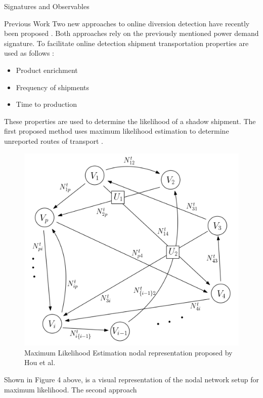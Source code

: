 \documentclass[final]{beamer}
\newlength{\onecolwid}
\newlength{\threecolwid}
\begin{document}
\begin{frame}[t]
\begin{columns}[t,totalwidth=\threecolwid]
\begin{column}{\onecolwid}
\begin{block}{Signatures and Observables}
\end{block}

    

\begin{block}{Previous Work}
Two new approaches to online diversion detection have recently been proposed \cite{Hou_2016,Yilmaz_2016}. Both
approaches rely on the previously mentioned power demand signature. To facilitate online detection shipment transportation
properties are used as follows \cite{Yilmaz_2016}:

\begin{itemize}
		\item Product enrichment
		\item Frequency of shipments
		\item Time to production
	\end{itemize}
These properties are used to determine the likelihood of a shadow shipment. The first proposed method uses maximum likelihood
estimation to determine unreported routes of transport \cite{Hou_2016}. 
\begin{figure}
	\includegraphics{Hou_Network.png}
	\caption{Maximum Likelihood Estimation nodal representation proposed by Hou et al\cite{Hou_2016}.}
\end{figure}
Shown in Figure 4 above, is a visual representation of the nodal network setup for maximum likelihood. The second approach

\end{block}
\end{column}
\end{columns}
\end{frame}
\end{document}
